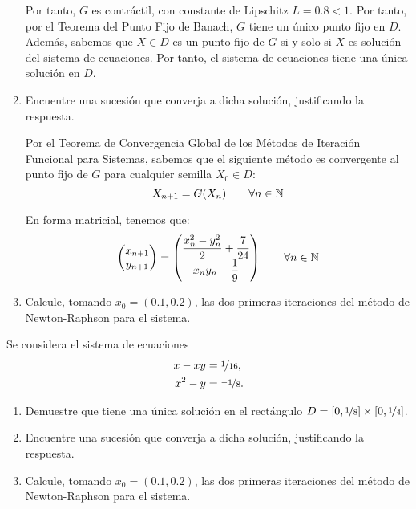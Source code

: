 \begin{ejercicio}
\begin{enumerate}
        Por tanto, $G$ es contráctil, con constante de Lipschitz $L=0.8<1$. Por tanto, por el Teorema del Punto Fijo de Banach, $G$ tiene un único punto fijo en $D$. Además, sabemos que $X\in D$ es un punto fijo de $G$ si y solo si $X$ es solución del sistema de ecuaciones. Por tanto, el sistema de ecuaciones tiene una única solución en $D$.


        \item Encuentre una sucesión que converja a dicha solución, justificando la respuesta.
        
        Por el Teorema de Convergencia Global de los Métodos de Iteración Funcional para Sistemas, sabemos que el siguiente método es convergente al punto fijo de $G$ para cualquier semilla $X_0\in D$:
        \begin{equation*}
            X_{n+1}=G(X_n)\qquad \forall n\in \mathbb{N}
        \end{equation*}

        En forma matricial, tenemos que:
        \begin{equation*}
            \begin{pmatrix}
                x_{n+1}\\
                y_{n+1}
            \end{pmatrix}=\begin{pmatrix}
                \dfrac{x_n^2-y_n^2}{2}+\dfrac{7}{24}\\
                x_ny_n+\dfrac{1}{9}
            \end{pmatrix}\qquad \forall n\in \mathbb{N}
        \end{equation*}
        \item Calcule, tomando $x_0 = (0.1, 0.2)$, las dos primeras iteraciones del método de Newton-Raphson para el sistema.
        
    \end{enumerate}
\end{ejercicio}


\begin{ejercicio}\label{ej:1.1.18}
    Se considera el sistema de ecuaciones
    \begin{align*}
        x - xy &= \nicefrac{1}{16}, \\
        x^2 - y &= \nicefrac{-1}{8}.
    \end{align*}
    \begin{enumerate}
        \item Demuestre que tiene una única solución en el rectángulo $D = [0, \nicefrac{1}{8}] \times [0, \nicefrac{1}{4}]$.
        \item Encuentre una sucesión que converja a dicha solución, justificando la respuesta.
        \item Calcule, tomando $x_0 = (0.1, 0.2)$, las dos primeras iteraciones del método de Newton-Raphson para el sistema.
    \end{enumerate}
\end{ejercicio}